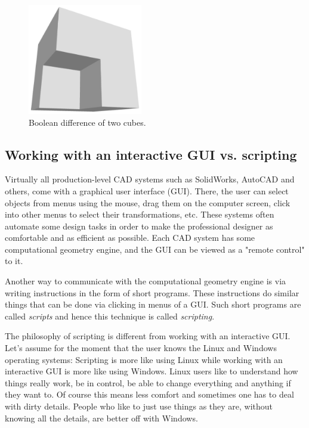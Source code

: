 \documentclass{article}
\begin{document}
\begin{figure}[!ht]
\begin{center}
\includegraphics[width=5cm]{img/diffcube.png}
\end{center}
\vspace{-6mm}
\caption{Boolean difference of two cubes.}
\vspace{-1cm}
\label{fig:diffcube}
\end{figure}
\newpage

\subsection{Working with an interactive GUI vs. scripting}\label{subsec:scripting}

Virtually all production-level CAD systems such as SolidWorks, AutoCAD and 
others, come with a graphical user interface (GUI). There, the user 
can select objects from menus using the mouse, drag them on the computer 
screen, click into other menus to select their transformations, etc. 
These systems often automate some design tasks in order to make 
the professional designer as comfortable and as efficient as possible.
Each CAD system has some computational geometry engine, and the GUI can be 
viewed as a "remote control" to it. 

Another way to communicate with the computational geometry engine is via 
writing instructions in the form of short programs. These instructions 
do similar things that can be done via clicking in menus of a GUI. 
Such short programs are called {\em scripts}
and hence this technique is called {\em scripting}.

The philosophy of scripting is different from working with an interactive GUI. 
Let's assume for the moment that the user knows the Linux and Windows operating 
systems: Scripting is more like using Linux while working with an interactive 
GUI is more like using Windows. Linux users like to understand how things really work,
be in control, be able to change everything and anything if they want to. 
Of course this means less comfort and sometimes one has to deal with dirty details. 
People who like to just use things as they are, without knowing all the details, 
are better off with Windows. 
\end{document}
